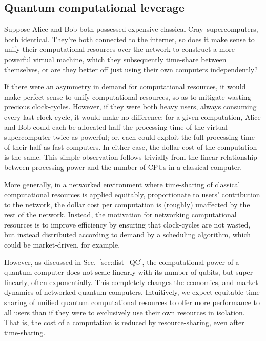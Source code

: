 \documentclass[aps, rmp, twocolumn, amsmath, amssymb, nofootinbib, superscriptaddress, longbibliography, floatfix, table-of-contents, eqsecnum]{revtex4-1}
\begin{document}
%
%

\subsection{Quantum computational leverage}\label{sec:quant_ec_lev}

Suppose Alice and Bob both possessed expensive classical Cray\texttrademark\, supercomputers, both identical. They're both connected to the internet, so does it make sense to unify their computational resources over the network to construct a more powerful virtual machine, which they subsequently time-share between themselves, or are they better off just using their own computers independently?

If there were an asymmetry in demand for computational resources, it would make perfect sense to unify computational resources, so as to mitigate wasting precious clock-cycles. However, if they were both heavy users, always consuming every last clock-cycle, it would make no difference: for a given computation, Alice and Bob could each be allocated half the processing time of the virtual supercomputer twice as powerful; or, each could exploit the full processing time of their half-as-fast computers. In either case, the dollar cost of the computation is the same. This simple observation follows trivially from the linear relationship between processing power and the number of CPUs in a classical computer.

More generally, in a networked environment where time-sharing of classical computational resources is applied equitably, proportionate to users' contribution to the network, the dollar cost per computation is (roughly) unaffected by the rest of the network. Instead, the motivation for networking computational resources is to improve efficiency by ensuring that clock-cycles are not wasted, but instead distributed according to demand by a scheduling algorithm, which could be market-driven, for example.

However, as discussed in Sec.~\ref{sec:dist_QC}, the computational power of a quantum computer does not scale linearly with its number of qubits, but super-linearly, often exponentially. This completely changes the economics, and market dynamics of networked quantum computers. Intuitively, we expect equitable time-sharing of unified quantum computational resources to offer more performance to all users than if they were to exclusively use their own resources in isolation. That is, the cost of a computation is reduced by resource-sharing, even after time-sharing.
\end{document}

